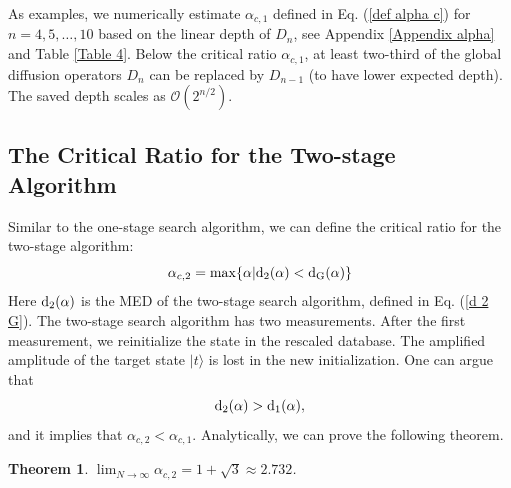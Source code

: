 \documentclass[%
 twocolumn,
 10pt,
 superscriptaddress,
 longbibliography,
 amsmath,amssymb,
 aps,
 pra,
floatfix,
]{revtex4-1}
\newcommand{\eq}{\begin{equation}}
\newcommand{\en}{\end{equation}}
\newtheorem{theo}{Theorem}
\begin{document}
As examples, we numerically estimate $\alpha_{c,1}$ defined in Eq. (\ref{def alpha c}) for $n=4,5,\ldots,10$ based on the linear depth of $D_n$, see Appendix \ref{Appendix alpha} and Table \ref{Table 4}. Below the critical ratio $\alpha_{c,1}$, at least two-third of the global diffusion operators $D_n$ can be replaced by $D_{n-1}$ (to have lower expected depth). The saved depth scales as $\mathcal O(2^{n/2})$. 


\subsection{\label{sec: two stage alpha}The Critical Ratio for the Two-stage Algorithm}

Similar to the one-stage search algorithm, we can define the critical ratio for the two-stage algorithm:
\eq
\label{def alpha c 2}
\alpha_{c,2}=\max\{\alpha|{\text d}_2(\alpha) <{\text d}_{\text G}(\alpha)\}
\en
Here $\text d_2(\alpha)$ is the MED of the two-stage search algorithm, defined in Eq. (\ref{d 2 G}). The two-stage search algorithm has two measurements. After the first measurement, we reinitialize the state in the rescaled database. The amplified amplitude of the target state $|t\rangle$ is lost in the new initialization. One can argue that  
\begin{equation}
    {\rm d}_2(\alpha)>{\rm d}_{1}(\alpha),
\end{equation}
and it implies that  $\alpha_{c,2}<\alpha_{c,1}$.  Analytically, we can prove the following theorem.
\begin{theo} \label{theorem 2}
    $\lim_{N\rightarrow\infty}\alpha_{c,2} = 1+\sqrt 3 \approx 2.732$.
\end{theo}
\end{document}
